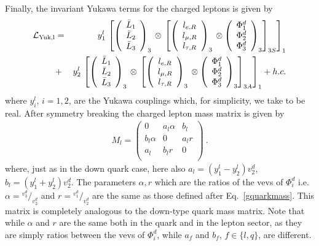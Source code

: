\documentclass[english,10pt,aps,prd,a4paper,preprintnumbers,floatfix,nofootinbib,showpacs,superscriptaddress]{revtex4-1}
\newcommand*\rfrac[2]{{}^{#1}\!/_{#2}}
\begin{document}
Finally, the invariant Yukawa terms for the charged leptons is given by
 \begin{eqnarray}
  \mathcal{L}_{\rm{Yuk}, l}  & = & y^l_1 \, \left[ \left( \begin{array}{c}  \bar{L}_{1}   \\ \bar{L}_{2} \\ \bar{L}_{3} \end{array} \right)_3  \, \otimes \, \left [  \left( \begin{array}{c}  l_{e,R}   \\ l_{\mu, R} \\ l_{\tau, R} \end{array} \right)_3 \, \otimes  \left( \begin{array}{c} \Phi_1^d   \\ \Phi_2^d \\ \Phi_3^d \end{array} \right)_{3}   \right]_{3S} \right ]_1
    \nonumber \\
  &+&    y^l_2 \, \left[ \left( \begin{array}{c}  \bar{L}_{1}   \\ \bar{L}_{2} \\ \bar{L}_{3} \end{array} \right)_3  \, \otimes \, \left [  \left( \begin{array}{c}  l_{e,R}   \\ l_{\mu, R} \\ l_{\tau, R} \end{array} \right)_3 \, \otimes  \left( \begin{array}{c} \Phi_1^d   \\ \Phi_2^d \\ \Phi_3^d \end{array} \right)_{3}   \right]_{3A} \right ]_1 + h.c.
    \label{lepyuk}
 \end{eqnarray}
 where $y^l_i$, $i = 1, 2$, are the Yukawa couplings which, for
 simplicity, we take to be real. After symmetry breaking the charged
 lepton mass matrix is given by
  \begin{eqnarray}
   M_{l} = \left( 
\begin{array}{ccc}
0               & a_l \alpha           &   b_l \\
b_l \alpha      & 0                    &   a_l r \\
a_l             & b_l r                &   0  \\  
\end{array}
\right)~.
   \label{glepmass}
  \end{eqnarray}
  where, just as in the down quark case, here also
  $a_l = (y_1^l-y_2^l) v_2^d$, $b_l = (y_1^l +y_2^l) v_2^d$.  
%
  The parameters $\alpha, r$ which are the ratios of the vevs of
  $\Phi^d_i$ i.e.  $\alpha = \rfrac{v_3^d}{v_2^d}$ and
  $r = \rfrac{v_1^d}{v_2^d}$ are the same as those defined after
  Eq.~\ref{gquarkmass}. This matrix is completely analogous to the
  down-type quark mass matrix. Note that while $\alpha$ and $r$ are the same
  both in the quark and in the lepton sector, as they are simply
  ratios between the vevs of $\Phi_i^d$, while $a_f$ and $b_f$,
  $f \in \{l, q\}$, are different.
\end{document}
